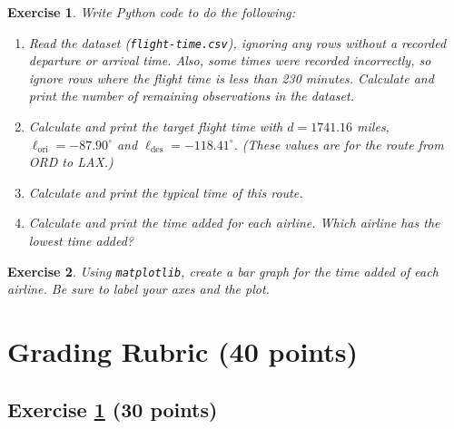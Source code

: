 \documentclass[11pt]{article}
\newcommand{\lori}{\ell_{\mathrm{ori}}}
\newcommand{\ldes}{\ell_{\mathrm{des}}}
\newtheorem{exercise}{Exercise}
\begin{document}
\begin{tcolorbox}[exeStyle]
\begin{exercise}
\label{exe:1}
Write Python code to do the following:
\begin{enumerate}[label=(\alph*)]
\item Read the dataset (\texttt{flight-time.csv}), ignoring any rows without a recorded departure or arrival time.
    Also, some times were recorded incorrectly, so ignore rows where the flight time is less than 230 minutes.
    Calculate and print the number of remaining observations in the dataset.
\item Calculate and print the target flight time with $d = 1741.16$ miles,
    $\lori = -87.90^{\circ}$ and $\ldes = -118.41^{\circ}$.
    (These values are for the route from ORD to LAX.)
\item Calculate and print the typical time of this route.
\item Calculate and print the time added for each airline.
    Which airline has the lowest time added?
\end{enumerate}
\end{exercise}
\end{tcolorbox}

\begin{tcolorbox}[exeStyle]
\begin{exercise}
\label{exe:2}
Using \texttt{matplotlib}, create a bar graph for the time added of each airline.
Be sure to label your axes and the plot.
\end{exercise}
\end{tcolorbox}

\nocite{nate2015how}
\bibPrep{}  %


\newpage
\appendix
\section{Grading Rubric (40 points)}

\subsection{Exercise \ref{exe:1} (30 points)}
\end{document}
